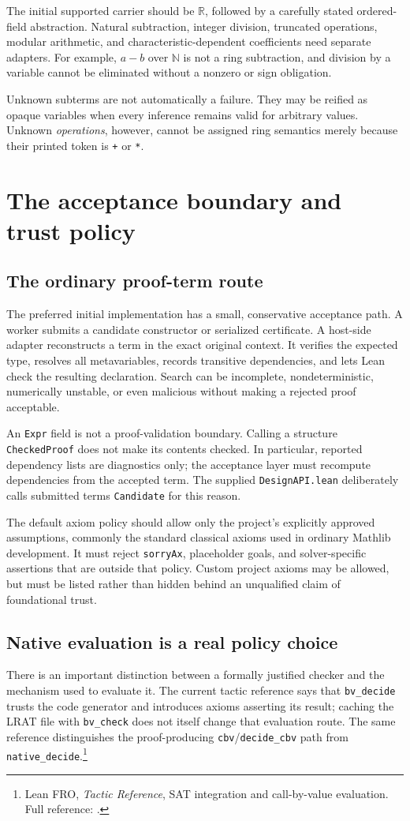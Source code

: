 \documentclass[11pt,letterpaper]{article}
\newcommand{\Lean}{\textsf{Lean}}
\newcommand{\R}{\mathbb{R}}
\newcommand{\N}{\mathbb{N}}
\newcommand{\src}[2]{\footnote{#2. Full reference: \cite{#1}.}}
\theoremstyle{definition}
\theoremstyle{remark}
\begin{document}
The initial supported carrier should be $\R$, followed by a carefully stated ordered-field abstraction. Natural subtraction, integer division, truncated operations, modular arithmetic, and characteristic-dependent coefficients need separate adapters. For example, $a-b$ over $\N$ is not a ring subtraction, and division by a variable cannot be eliminated without a nonzero or sign obligation.

Unknown subterms are not automatically a failure. They may be reified as opaque variables when every inference remains valid for arbitrary values. Unknown \emph{operations}, however, cannot be assigned ring semantics merely because their printed token is \texttt{+} or \texttt{*}.

\section{The acceptance boundary and trust policy}
\subsection{The ordinary proof-term route}
The preferred initial implementation has a small, conservative acceptance path. A worker submits a candidate constructor or serialized certificate. A host-side adapter reconstructs a term in the exact original context. It verifies the expected type, resolves all metavariables, records transitive dependencies, and lets \Lean{} check the resulting declaration. Search can be incomplete, nondeterministic, numerically unstable, or even malicious without making a rejected proof acceptable.

An \texttt{Expr} field is not a proof-validation boundary. Calling a structure \texttt{CheckedProof} does not make its contents checked. In particular, reported dependency lists are diagnostics only; the acceptance layer must recompute dependencies from the accepted term. The supplied \texttt{DesignAPI.lean} deliberately calls submitted terms \texttt{Candidate} for this reason.

The default axiom policy should allow only the project's explicitly approved assumptions, commonly the standard classical axioms used in ordinary Mathlib development. It must reject \texttt{sorryAx}, placeholder goals, and solver-specific assertions that are outside that policy. Custom project axioms may be allowed, but must be listed rather than hidden behind an unqualified claim of foundational trust.

\subsection{Native evaluation is a real policy choice}
There is an important distinction between a formally justified checker and the mechanism used to evaluate it. The current tactic reference says that \texttt{bv\_decide} trusts the code generator and introduces axioms asserting its result; caching the LRAT file with \texttt{bv\_check} does not itself change that evaluation route. The same reference distinguishes the proof-producing \texttt{cbv}/\texttt{decide\_cbv} path from \texttt{native\_decide}.\src{tactics}{Lean FRO, \emph{Tactic Reference}, SAT integration and call-by-value evaluation}
\end{document}
